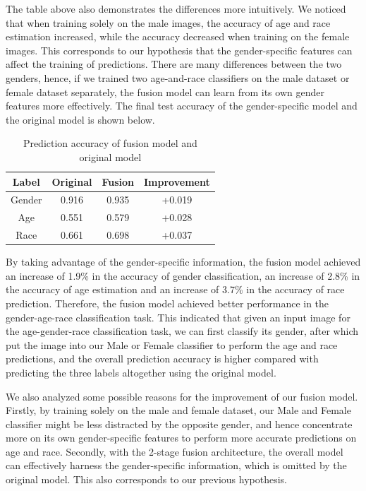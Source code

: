 \documentclass[DIV=calc, paper=a4, fontsize=10pt, twocolumn]{article}
\begin{document}
	
	The table above also demonstrates the differences more intuitively. We noticed that when training solely on the male images, the accuracy of age and race estimation increased, while the accuracy decreased when training on the female images. This corresponds to our hypothesis that the gender-specific features can affect the training of predictions. There are many differences between the two genders, hence, if we trained two age-and-race classifiers on the male dataset or female dataset separately, the fusion model can learn from its own gender features more effectively. The final test accuracy of the gender-specific model and the original model is shown below. 
	
	\begin{table}[H]
		\centering
		\begin{tabular}{|c|c|c|c|}
			\hline
			Label & Original & Fusion & Improvement \\ 
			\hline
			Gender & 0.916 & 0.935 & +0.019 \\ 
			\hline
			Age & 0.551 & 0.579 & +0.028 \\
			\hline
			Race & 0.661 & 0.698 & +0.037 \\
			\hline
		\end{tabular}
		\caption{Prediction accuracy of fusion model and original model}
	\end{table}

	
	By taking advantage of the gender-specific information, the fusion model achieved an increase of 1.9\% in the accuracy of gender classification, an increase of 2.8\% in the accuracy of age estimation and an increase of 3.7\% in the accuracy of race prediction. Therefore, the fusion model achieved better performance in the gender-age-race classification task. This indicated that given an input image for the age-gender-race classification task, we can first classify its gender, after which put the image into our Male or Female classifier to perform the age and race predictions, and the overall prediction accuracy is higher compared with predicting the three labels altogether using the original model.
	
	We also analyzed some possible reasons for the improvement of our fusion model. Firstly, by training solely on the male and female dataset, our Male and Female classifier might be less distracted by the opposite gender, and hence concentrate more on its own gender-specific features to perform more accurate predictions on age and race. Secondly, with the 2-stage fusion architecture, the overall model can effectively harness the gender-specific information, which is omitted by the original model. This also corresponds to our previous hypothesis. 
	
\end{document}
